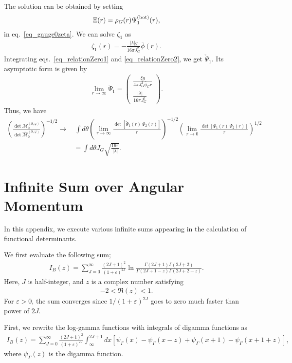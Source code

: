 \documentclass[12pt]{article}
\begin{document}
The solution can be obtained by setting
\begin{align}
 \Xi(r) = \rho_G(r)\Psi_1^{\rm (bot)}(r),
\end{align}
in eq.~\eqref{eq_gauge0zeta}.
We can solve $\zeta_1$ as
\begin{align}
 \zeta_1(r) = -\frac{|\lambda|g}{16\pi J_G^2}\bar\phi(r).
\end{align}
Integrating eqs.~\eqref{eq_relationZero1} and \eqref{eq_relationZero2},
we get $\check\Psi_1$. Its asymptotic form is given by
\begin{align}
 \lim_{r\to\infty}\check\Psi_1 =
 \begin{pmatrix}
  \frac{\xi g}{4\pi J_G^2\bar\phi_C r} \\
  \frac{|\lambda|}{16\pi J_G^2}
 \end{pmatrix}.
\end{align}
Thus, we have
\begin{align}
  \left(
    \frac{\det\mathcal M^{(S,\varphi)}_0}{\det\widehat{\mathcal M}^{(S,\varphi)}_0}
  \right)^{-1/2}
  \to &\ 
  \int d\theta
  \left(
    \lim_{r\to\infty}\frac{\det[\check\Psi_1(r)~\Psi_2(r)]}{r}
  \right)^{-1/2}
  \left(
    \lim_{r\to0}\frac{\det[\Psi_1(r)~\Psi_2(r)]}{r}
  \right)^{1/2}
  \nonumber \\ & =
  \int d\theta J_G \sqrt{\frac{16\pi}{|\lambda|}}.
\end{align}

\section{Infinite Sum over Angular Momentum}
\label{apx_infiniteSum}
\setcounter{equation}{0}

In this appendix, we execute various infinite sums appearing in the
calculation of functional determinants.

We first evaluate the following sum;
\begin{align}
 I_B(z) = \sum_{J=0}^\infty\frac{(2J+1)^2}{(1+\varepsilon)^{2J}}
 \ln\frac{\Gamma(2J+1)\Gamma(2J+2)}{\Gamma(2J+1-z)\Gamma(2J+2+z)}.
\end{align}
Here, $J$ is half-integer, and $z$ is a complex number satisfying
\begin{align}
 -2<\Re(z)<1.
 \label{eq_rez}
\end{align}
For $\varepsilon>0$, the sum converges since $1/(1+\varepsilon)^{2J}$
goes to zero much faster than power of $2J$.

First, we rewrite the log-gamma functions with integrals of digamma
functions as
\begin{align}
 I_B(z) = \sum_{J=0}^{\infty}\frac{(2J+1)^2}{(1+\varepsilon)^{2J}}
 \int_\infty^{2J+1}dx
 \left[
  \psi_{\Gamma}(x)-\psi_{\Gamma}(x-z)+\psi_{\Gamma}(x+1)-\psi_{\Gamma}(x+1+z)
 \right],
\end{align}
where $\psi_{\Gamma}(z)$ is the digamma function.
\end{document}
